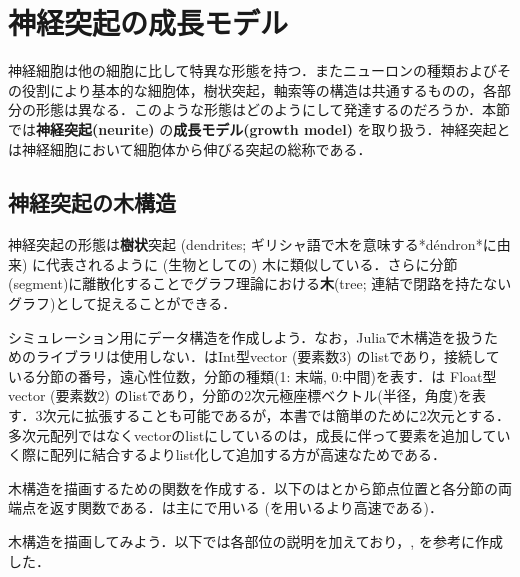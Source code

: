 \section{神経突起の成長モデル}
神経細胞は他の細胞に比して特異な形態を持つ．またニューロンの種類およびその役割により基本的な細胞体，樹状突起，軸索等の構造は共通するものの，各部分の形態は異なる．このような形態はどのようにして発達するのだろうか．本節では\textbf{神経突起(neurite)} の\textbf{成長モデル(growth model)} を取り扱う．神経突起とは神経細胞において細胞体から伸びる突起の総称である．
\subsection{神経突起の木構造}
神経突起の形態は\textbf{樹状}突起 (dendrites; ギリシャ語で木を意味する*déndron*に由来) に代表されるように (生物としての) 木に類似している．さらに分節(segment)に離散化することでグラフ理論における\textbf{木}(tree; 連結で閉路を持たないグラフ)として捉えることができる．

シミュレーション用にデータ構造を作成しよう．なお，Juliaで木構造を扱うためのライブラリは使用しない．はInt型vector (要素数3) のlistであり，接続している分節の番号，遠心性位数，分節の種類(1: 末端, 0:中間)を表す．は Float型vector (要素数2) のlistであり，分節の2次元極座標ベクトル(半径，角度)を表す．3次元に拡張することも可能であるが，本書では簡単のために2次元とする．多次元配列ではなくvectorのlistにしているのは，成長に伴って要素を追加していく際に配列に結合するよりlist化して追加する方が高速なためである．


木構造を描画するための関数を作成する．以下のはとから節点位置と各分節の両端点を返す関数である．は主にで用いる (を用いるより高速である)．


木構造を描画してみよう．以下では各部位の説明を加えており，\citep{Koene2009-hv}, \citep{Cuntz2010-in}を参考に作成した．



